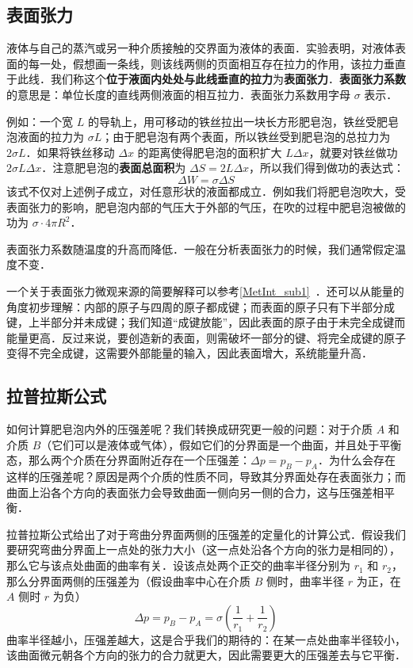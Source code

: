 

\subsection{表面张力}

液体与自己的蒸汽或另一种介质接触的交界面为液体的表面．实验表明，对液体表面的每一处，假想画一条线，则该线两侧的页面相互存在拉力的作用，该拉力垂直于此线．我们称这个\textbf{位于液面内处处与此线垂直的拉力}为\textbf{表面张力}．\textbf{表面张力系数} 的意思是：单位长度的直线两侧液面的相互拉力．表面张力系数用字母 $\sigma$ 表示．

例如：一个宽 $L$ 的导轨上，用可移动的铁丝拉出一块长方形肥皂泡，铁丝受肥皂泡液面的拉力为 $\sigma L$；由于肥皂泡有两个表面，所以铁丝受到肥皂泡的总拉力为 $2\sigma L$．如果将铁丝移动 $\Delta x$ 的距离使得肥皂泡的面积扩大 $L\Delta x$，就要对铁丝做功 $2\sigma L\Delta x$．注意肥皂泡的\textbf{表面总面积}为 $\Delta S=2 L \Delta x$，所以我们得到做功的表达式：
\begin{equation}
\Delta W=\sigma \Delta S
\end{equation}
该式不仅对上述例子成立，对任意形状的液面都成立．例如我们将肥皂泡吹大，受表面张力的影响，肥皂泡内部的气压大于外部的气压，在吹的过程中肥皂泡被做的功为 $\sigma\cdot 4\pi R^2$．

表面张力系数随温度的升高而降低．一般在分析表面张力的时候，我们通常假定温度不变．

一个关于表面张力微观来源的简要解释可以参考\autoref{MetInt_sub1}~．还可以从能量的角度初步理解：内部的原子与四周的原子都成键；而表面的原子只有下半部分成键，上半部分并未成键；我们知道“成键放能”，因此表面的原子由于未完全成键而能量更高．反过来说，要创造新的表面，则需破坏一部分的键、将完全成键的原子变得不完全成键，这需要外部能量的输入，因此表面增大，系统能量升高．

\subsection{拉普拉斯公式}
如何计算肥皂泡内外的压强差呢？我们转换成研究更一般的问题：对于介质 $A$ 和介质 $B$（它们可以是液体或气体），假如它们的分界面是一个曲面，并且处于平衡态，那么两个介质在分界面附近存在一个压强差：$\Delta p=p_B-p_A$．为什么会存在这样的压强差呢？原因是两个介质的性质不同，导致其分界面处存在表面张力；而曲面上沿各个方向的表面张力会导致曲面一侧向另一侧的合力，这与压强差相平衡．

拉普拉斯公式给出了对于弯曲分界面两侧的压强差的定量化的计算公式．假设我们要研究弯曲分界面上一点处的张力大小（这一点处沿各个方向的张力是相同的），那么它与该点处曲面的曲率有关．设该点处两个正交的曲率半径分别为 $r_1$ 和 $r_2$，那么分界面两侧的压强差为（假设曲率中心在介质 $B$ 侧时，曲率半径 $r$ 为正，在 $A$ 侧时 $r$ 为负）
\begin{equation}
\Delta p=p_B-p_A=\sigma(\frac{1}{r_1}+\frac{1}{r_2})
\end{equation}
曲率半径越小，压强差越大，这是合乎我们的期待的：在某一点处曲率半径较小，该曲面微元朝各个方向的张力的合力就更大，因此需要更大的压强差去与它平衡．

